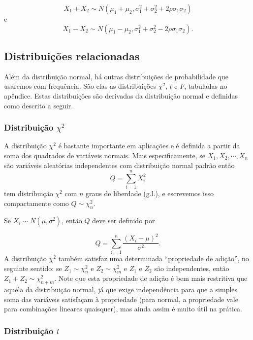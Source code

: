 \documentclass[
]{book}
\theoremstyle{definition}
\theoremstyle{definition}
\theoremstyle{definition}
\theoremstyle{remark}
\begin{document}
\[X_1+X_2 \sim N(\mu_1+\mu_2, \sigma^2_1+\sigma^2_2+2\rho \sigma_1\sigma_2)\]
e
\[X_1-X_2 \sim N(\mu_1-\mu_2, \sigma^2_1+\sigma^2_2-2\rho \sigma_1\sigma_2).\]

\hypertarget{distribuiuxe7uxf5es-relacionadas}{%
\subsection{Distribuições relacionadas}\label{distribuiuxe7uxf5es-relacionadas}}

Além da distribuição normal, há outras distribuições de probabilidade que usaremos com frequência. São elas as distribuições \(\chi^2\), \(t\) e \(F\), tabuladas no apêndice. Estas distribuições são derivadas da distribuição normal e definidas como descrito a seguir.

\hypertarget{distribuiuxe7uxe3o-chi2}{%
\subsubsection{\texorpdfstring{Distribuição \(\chi^2\)}{Distribuição \textbackslash chi\^{}2}}\label{distribuiuxe7uxe3o-chi2}}

A distribuição \(\chi^2\) é bastante importante em aplicações e é definida a partir da soma dos quadrados de variáveis normais. Mais especificamente, se \(X_1, X_2, \cdots, X_n\) são variáveis aleatórias independentes com distribuição normal padrão então
\[Q=\sum_{i=1}^n X_i^2\]
tem distribuição \(\chi^2\) com \(n\) graus de liberdade (g.l.), e escrevemos isso compactamente como \(Q \sim \chi_n^2\).

Se \(X_i \sim N(\mu, \sigma^2)\), então \(Q\) deve ser definido por

\[Q=\sum_{i=1}^n \frac{(X_i-\mu)^2}{\sigma^2}.\]
A distribuição \(\chi^2\) também satisfaz uma determinada ``propriedade de adição'',
no seguinte sentido: se \(Z_1 \sim \chi_n^2\) e \(Z_2 \sim \chi_m^2\) e \(Z_1\) e \(Z_2\) são
independentes, então \(Z_1+Z_2 \sim \chi^2_{n+m}\). Note que esta propriedade de adição é bem mais restritiva que aquela da distribuição normal, já que exige independência para que a simples soma das variáveis satisfaçam à propriedade (para normal, a propriedade vale para combinações lineares quaisquer), mas ainda assim é muito útil na prática.

\hypertarget{distribuiuxe7uxe3o-t}{%
\subsubsection{\texorpdfstring{Distribuição \(t\)}{Distribuição t}}\label{distribuiuxe7uxe3o-t}}
\end{document}
